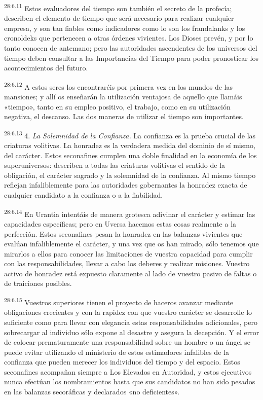 \par
\textsuperscript{28:6.11} Estos evaluadores del tiempo son también el secreto de la profecía; describen el elemento de tiempo que será necesario para realizar cualquier empresa, y son tan fiables como indicadores como lo son los frandalanks y los cronoldeks que pertenecen a otras órdenes vivientes. Los Dioses prevén, y por lo tanto conocen de antemano; pero las autoridades ascendentes de los universos del tiempo deben consultar a las Importancias del Tiempo para poder pronosticar los acontecimientos del futuro.

\par
\textsuperscript{28:6.12} A estos seres los encontraréis por primera vez en los mundos de las mansiones; y allí os enseñarán la utilización ventajosa de aquello que llamáis «tiempo», tanto en su empleo positivo, el trabajo, como en su utilización negativa, el descanso. Las dos maneras de utilizar el tiempo son importantes.

\par
\textsuperscript{28:6.13} 4. \textit{La Solemnidad de la Confianza.} La confianza es la prueba crucial de las criaturas volitivas. La honradez es la verdadera medida del dominio de sí mismo, del carácter. Estos seconafines cumplen una doble finalidad en la economía de los superuniversos: describen a todas las criaturas volitivas el sentido de la obligación, el carácter sagrado y la solemnidad de la confianza. Al mismo tiempo reflejan infaliblemente para las autoridades gobernantes la honradez exacta de cualquier candidato a la confianza o a la fiabilidad.

\par
\textsuperscript{28:6.14} En Urantia intentáis de manera grotesca adivinar el carácter y estimar las capacidades específicas; pero en Uversa hacemos estas cosas realmente a la perfección. Estos seconafines pesan la honradez en las balanzas vivientes que evalúan infaliblemente el carácter, y una vez que os han mirado, sólo tenemos que mirarlos a ellos para conocer las limitaciones de vuestra capacidad para cumplir con las responsabilidades, llevar a cabo los deberes y realizar misiones. Vuestro activo de honradez está expuesto claramente al lado de vuestro pasivo de faltas o de traiciones posibles.

\par
\textsuperscript{28:6.15} Vuestros superiores tienen el proyecto de haceros avanzar mediante obligaciones crecientes y con la rapidez con que vuestro carácter se desarrolle lo suficiente como para llevar con elegancia estas responsabilidades adicionales, pero sobrecargar al individuo sólo expone al desastre y asegura la decepción. Y el error de colocar prematuramente una responsabilidad sobre un hombre o un ángel se puede evitar utilizando el ministerio de estos estimadores infalibles de la confianza que pueden merecer los individuos del tiempo y del espacio. Estos seconafines acompañan siempre a Los Elevados en Autoridad, y estos ejecutivos nunca efectúan los nombramientos hasta que sus candidatos no han sido pesados en las balanzas secoráficas y declarados «no deficientes».

